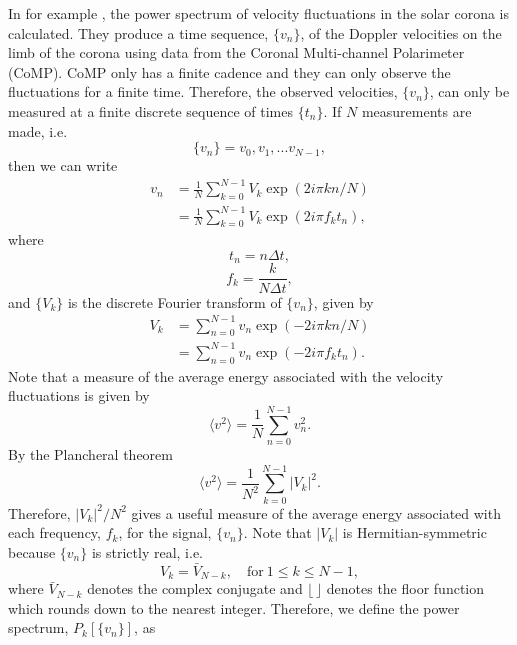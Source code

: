 In for example \citet{Morton2016,Morton2019}, the power spectrum of velocity fluctuations in the solar corona is calculated. They produce a time sequence, $\{v_n\}$, of the Doppler velocities on the limb of the corona using data from the Coronal Multi-channel Polarimeter (CoMP). CoMP only has a finite cadence and they can only observe the fluctuations for a finite time. Therefore, the observed velocities, $\{v_n\}$, can only be measured at a finite discrete sequence of times $\{t_n\}$. If $N$ measurements are made, i.e.
\[\{v_n\}=v_0, v_1, ... v_{N-1},\]
then we can write 
\[\begin{aligned}
v_n &= \frac{1}{N}\sum_{k=0}^{N-1}V_k\exp(2i\pi  k n / N) \\
&= \frac{1}{N}\sum_{k=0}^{N-1}V_k\exp(2i\pi f_k t_n),
\end{aligned}\]
where
\[t_n = n\Delta t,\]
\[f_k = \frac{k}{N \Delta t},\]
and $\{V_k\}$ is the discrete Fourier transform of $\{v_n\}$, given by
\[\begin{aligned}
V_k&=\sum_{n=0}^{N-1}v_n\exp(-2i\pi k n / N) \\
&=\sum_{n=0}^{N-1}v_n\exp(-2i\pi f_k t_n).
\end{aligned}\]
Note that a measure of the average energy associated with the velocity fluctuations is given by
\begin{equation}
    \langle v^2 \rangle = \frac{1}{N}\sum_{n=0}^{N-1}v_n^2.
\end{equation}
By the Plancheral theorem
\begin{equation}
    \langle v^2 \rangle = \frac{1}{N^2}\sum_{k=0}^{N-1}|V_k|^2.
\end{equation}
Therefore, $|V_k|^2/N^2$ gives a useful measure of the average energy associated with each frequency, $f_k$, for the signal, $\{v_n\}$. Note that $|V_k|$ is Hermitian-symmetric because $\{v_n\}$ is strictly real, i.e.
\begin{equation}
    V_k = \bar{V}_{N-k},\quad \text{for}\ 1 \le k\le N-1,
\end{equation}
where $\bar{V}_{N-k}$ denotes the complex conjugate and $\lfloor\,\rfloor$ denotes the floor function which rounds down to the nearest integer. Therefore, we define the power spectrum, $P_k[\{v_n\}]$, as
